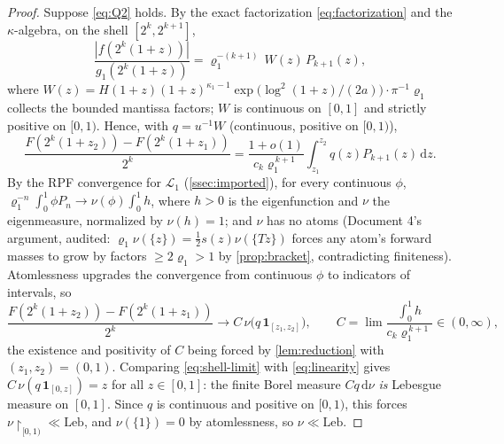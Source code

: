 \documentclass[11pt,oneside]{article}
\theoremstyle{definition}
\theoremstyle{remark}
\newcommand{\dd}{\,\mathrm d}
\newcommand{\smallo}{o}
\newcommand{\Lop}{\mathcal L}
\begin{document}
\begin{proof}
Suppose \eqref{eq:Q2} holds.  By the exact factorization
\eqref{eq:factorization} and the $\kappa$-algebra, on the shell
$[2^k,2^{k+1}]$,
\[
 \frac{|f(2^k(1+z))|}{g_1(2^k(1+z))}
 =\varrho_1^{-(k+1)}\,W(z)\,P_{k+1}(z),
\]
where $W(z)=H(1+z)(1+z)^{\kappa_1-1}
\exp\bigl(\log^2(1+z)/(2a)\bigr)\cdot\pi^{-1}\varrho_1$ collects the
bounded mantissa factors; $W$ is continuous on $[0,1]$ and strictly
positive on $[0,1)$.  Hence, with $q=u^{-1}W$ (continuous, positive on
$[0,1)$),
\[
 \frac{F(2^k(1+z_2))-F(2^k(1+z_1))}{2^k}
 =\frac{1+\smallo(1)}{c_k\varrho_1^{\,k+1}}
 \int_{z_1}^{z_2}q(z)P_{k+1}(z)\dd z .
\]
By the RPF convergence for $\Lop_1$ (\cref{ssec:imported}), for every
continuous $\phi$,
$\varrho_1^{-n}\int_0^1\phi P_n\to\nu(\phi)\int_0^1h$, where
$h>0$ is the eigenfunction and $\nu$ the eigenmeasure, normalized by
$\nu(h)=1$; and $\nu$ has no atoms (Document 4's argument, audited:
$\varrho_1\nu(\{z\})=\tfrac12s(z)\nu(\{Tz\})$ forces any atom's forward
masses to grow by factors $\ge2\varrho_1>1$ by
\cref{prop:bracket}, contradicting finiteness).  Atomlessness upgrades
the convergence from continuous $\phi$ to indicators of intervals, so
\begin{equation}
 \frac{F(2^k(1+z_2))-F(2^k(1+z_1))}{2^k}
 \longrightarrow
 C\,\nu\bigl(q\,\mathbf 1_{[z_1,z_2]}\bigr),
 \qquad
 C=\lim\frac{\int_0^1h}{c_k\varrho_1^{\,k+1}}\in(0,\infty),
 \label{eq:shell-limit}
\end{equation}
the existence and positivity of $C$ being forced by
\cref{lem:reduction} with $(z_1,z_2)=(0,1)$.  Comparing
\eqref{eq:shell-limit} with \eqref{eq:linearity} gives
$C\,\nu(q\,\mathbf 1_{[0,z]})=z$ for all $z\in[0,1]$: the finite Borel
measure $Cq\dd\nu$ \emph{is} Lebesgue measure on $[0,1]$.  Since $q$ is
continuous and positive on $[0,1)$, this forces
$\nu\restriction_{[0,1)}\ll\mathrm{Leb}$, and $\nu(\{1\})=0$ by
atomlessness, so $\nu\ll\mathrm{Leb}$.


\end{proof}
\end{document}
